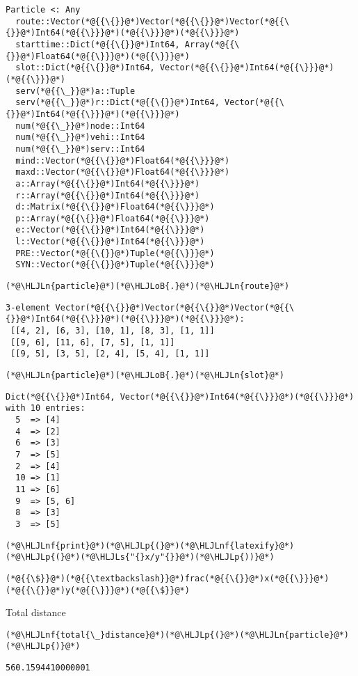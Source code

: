 \documentclass[12pt,a4paper]{article}
\newcommand{\HLJLn}[1]{#1}
\newcommand{\HLJLnf}[1]{\textcolor[RGB]{66,102,213}{#1}}
\newcommand{\HLJLs}[1]{\textcolor[RGB]{201,61,57}{#1}}
\newcommand{\HLJLoB}[1]{\textcolor[RGB]{102,102,102}{\textbf{#1}}}
\newcommand{\HLJLp}[1]{#1}
\begin{document}
\begin{lstlisting}
Particle <: Any
  route::Vector(*@{{\{}}@*)Vector(*@{{\{}}@*)Vector(*@{{\{}}@*)Int64(*@{{\}}}@*)(*@{{\}}}@*)(*@{{\}}}@*)
  starttime::Dict(*@{{\{}}@*)Int64, Array(*@{{\{}}@*)Float64(*@{{\}}}@*)(*@{{\}}}@*)
  slot::Dict(*@{{\{}}@*)Int64, Vector(*@{{\{}}@*)Int64(*@{{\}}}@*)(*@{{\}}}@*)
  serv(*@{{\_}}@*)a::Tuple
  serv(*@{{\_}}@*)r::Dict(*@{{\{}}@*)Int64, Vector(*@{{\{}}@*)Int64(*@{{\}}}@*)(*@{{\}}}@*)
  num(*@{{\_}}@*)node::Int64
  num(*@{{\_}}@*)vehi::Int64
  num(*@{{\_}}@*)serv::Int64
  mind::Vector(*@{{\{}}@*)Float64(*@{{\}}}@*)
  maxd::Vector(*@{{\{}}@*)Float64(*@{{\}}}@*)
  a::Array(*@{{\{}}@*)Int64(*@{{\}}}@*)
  r::Array(*@{{\{}}@*)Int64(*@{{\}}}@*)
  d::Matrix(*@{{\{}}@*)Float64(*@{{\}}}@*)
  p::Array(*@{{\{}}@*)Float64(*@{{\}}}@*)
  e::Vector(*@{{\{}}@*)Int64(*@{{\}}}@*)
  l::Vector(*@{{\{}}@*)Int64(*@{{\}}}@*)
  PRE::Vector(*@{{\{}}@*)Tuple(*@{{\}}}@*)
  SYN::Vector(*@{{\{}}@*)Tuple(*@{{\}}}@*)
\end{lstlisting}


\begin{lstlisting}
(*@\HLJLn{particle}@*)(*@\HLJLoB{.}@*)(*@\HLJLn{route}@*)
\end{lstlisting}

\begin{lstlisting}
3-element Vector(*@{{\{}}@*)Vector(*@{{\{}}@*)Vector(*@{{\{}}@*)Int64(*@{{\}}}@*)(*@{{\}}}@*)(*@{{\}}}@*):
 [[4, 2], [6, 3], [10, 1], [8, 3], [1, 1]]
 [[9, 6], [11, 6], [7, 5], [1, 1]]
 [[9, 5], [3, 5], [2, 4], [5, 4], [1, 1]]
\end{lstlisting}


\begin{lstlisting}
(*@\HLJLn{particle}@*)(*@\HLJLoB{.}@*)(*@\HLJLn{slot}@*)
\end{lstlisting}

\begin{lstlisting}
Dict(*@{{\{}}@*)Int64, Vector(*@{{\{}}@*)Int64(*@{{\}}}@*)(*@{{\}}}@*) with 10 entries:
  5  => [4]
  4  => [2]
  6  => [3]
  7  => [5]
  2  => [4]
  10 => [1]
  11 => [6]
  9  => [5, 6]
  8  => [3]
  3  => [5]
\end{lstlisting}


\begin{lstlisting}
(*@\HLJLnf{print}@*)(*@\HLJLp{(}@*)(*@\HLJLnf{latexify}@*)(*@\HLJLp{(}@*)(*@\HLJLs{"{}x/y"{}}@*)(*@\HLJLp{))}@*)
\end{lstlisting}

\begin{lstlisting}
(*@{{\$}}@*)(*@{{\textbackslash}}@*)frac(*@{{\{}}@*)x(*@{{\}}}@*)(*@{{\{}}@*)y(*@{{\}}}@*)(*@{{\$}}@*)
\end{lstlisting}


Total distance


\begin{lstlisting}
(*@\HLJLnf{total{\_}distance}@*)(*@\HLJLp{(}@*)(*@\HLJLn{particle}@*)(*@\HLJLp{)}@*)
\end{lstlisting}

\begin{lstlisting}
560.1594410000001
\end{lstlisting}
\end{document}
